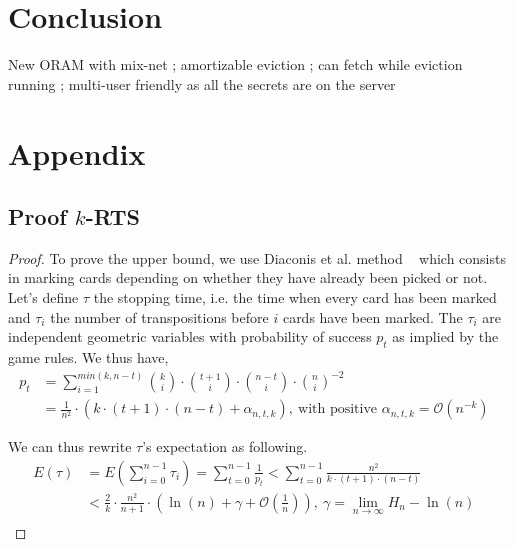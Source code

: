 \documentclass{llncs}
\begin{document}
\iffalse
\section{Acknowledgement}
Danezis was supported by H2020  PANORAMIX Grant (ref. 653497) and EPSRC Grant EP/M013286/1; and Toledo by Microsoft Research.
\fi

\section{Conclusion}\label{Conclusion}
New ORAM with mix-net ; amortizable eviction ; can fetch while eviction running ; multi-user friendly as all the secrets are on the server



\pagebreak



\pagebreak
\section{Appendix}
\subsection{Proof $k$-RTS}\label{proof:kRTS}
\begin{proof}
To prove the upper bound, we use Diaconis et al. method ~\cite{aldous1986shuffling} which consists in marking cards depending on whether they have already been picked or not. Let's define $\tau$ the stopping time, i.e. the time when every card has been marked and $\tau_i$ the number of transpositions before $i$ cards have been marked. The $\tau_i$ are independent geometric variables with probability of success $p_t$ as implied by the game rules.
We thus have,
\begin{align*}
 p_t &= \sum_{i=1}^{min(k,n-t)} {k \choose i} \cdot {t+1 \choose i} \cdot {n-t \choose i}\cdot{n \choose i}^{-2}&\\
 &= \frac{1}{n^2} \cdot \left ( k \cdot (t+1)\cdot(n-t) + \alpha_{n,t,k}\right ),\ \text{with positive } \alpha_{n,t,k} = \mathcal{O}\left(n^{-k}\right )
\end{align*}

We can thus rewrite $\tau$'s expectation as following.
\begin{align*}
 E(\tau) &=  E \left ( \sum_{i=0}^{n-1} \tau_i \right ) = \sum_{t=0}^{n-1} \frac{1}{p_{t}}  < \sum_{t=0}^{n-1} \frac{n^2}{k \cdot (t+1)\cdot(n-t)}&\\  
 &< \frac{2}{k} \cdot \frac{n^2}{n+1} \cdot \left( \ln(n) + \gamma +\mathcal{O}(\frac{1}{n}) \right),\ \gamma = \lim_{n \to \infty} H_n - \ln(n)& \\
 \end{align*}
 \end{proof}
 \vspace{-2.5em}
 
\end{document}
